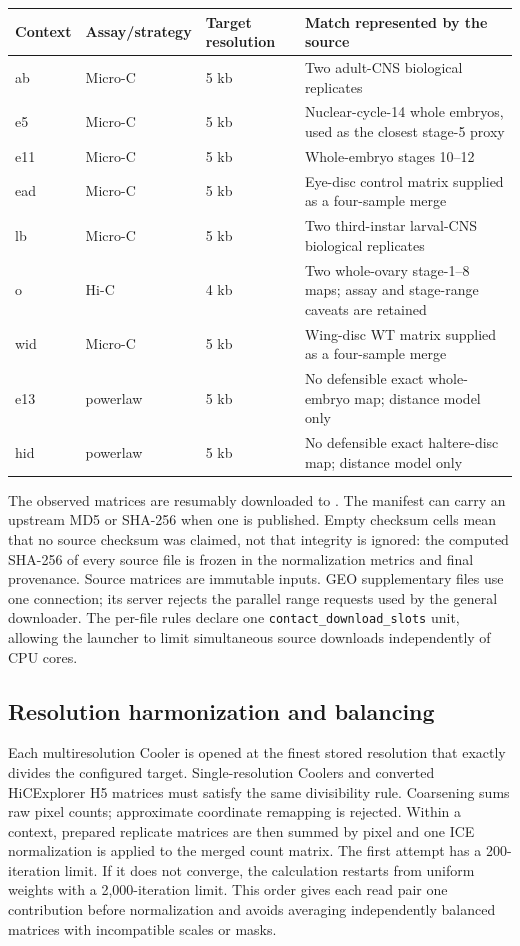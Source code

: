 \documentclass[11pt]{article}
\newcommand{\filep}[1]{\path{#1}}
\begin{document}
\begin{longtable}{>{\ttfamily}p{} p{} p{} p{}}
\toprule
\normalfont Context & Assay/strategy & Target resolution & Match represented by the source \\
\midrule
\endhead
ab & Micro-C & 5 kb & Two adult-CNS biological replicates \\
e5 & Micro-C & 5 kb & Nuclear-cycle-14 whole embryos, used as the closest stage-5 proxy \\
e11 & Micro-C & 5 kb & Whole-embryo stages 10--12 \\
ead & Micro-C & 5 kb & Eye-disc control matrix supplied as a four-sample merge \\
lb & Micro-C & 5 kb & Two third-instar larval-CNS biological replicates \\
o & Hi-C & 4 kb & Two whole-ovary stage-1--8 maps; assay and stage-range caveats are retained \\
wid & Micro-C & 5 kb & Wing-disc WT matrix supplied as a four-sample merge \\
e13 & powerlaw & 5 kb & No defensible exact whole-embryo map; distance model only \\
hid & powerlaw & 5 kb & No defensible exact haltere-disc map; distance model only \\
\bottomrule
\end{longtable}

The observed matrices are resumably downloaded to
\filep{data/raw/contacts/}.  The manifest can carry an upstream MD5 or SHA-256
when one is published.  Empty checksum cells mean that no source checksum was
claimed, not that integrity is ignored: the computed SHA-256 of every source
file is frozen in the normalization metrics and final provenance.  Source
matrices are immutable inputs.  GEO supplementary files use one connection;
its server rejects the parallel range requests used by the general downloader.
The per-file rules declare one \texttt{contact\_download\_slots} unit, allowing
the launcher to limit simultaneous source downloads independently of CPU cores.

\subsection{Resolution harmonization and balancing}

Each multiresolution Cooler is opened at the finest stored resolution that
exactly divides the configured target.  Single-resolution Coolers and converted
HiCExplorer H5 matrices must satisfy the same divisibility rule.  Coarsening
sums raw pixel counts; approximate coordinate remapping is rejected.  Within a
context, prepared replicate matrices are then summed by pixel and one ICE
normalization is applied to the merged count matrix.  The first attempt has a
200-iteration limit.  If it does not converge, the calculation restarts from
uniform weights with a 2,000-iteration limit.  This order gives each read pair
one contribution before normalization and avoids averaging independently
balanced matrices with incompatible scales or masks.
\end{document}
